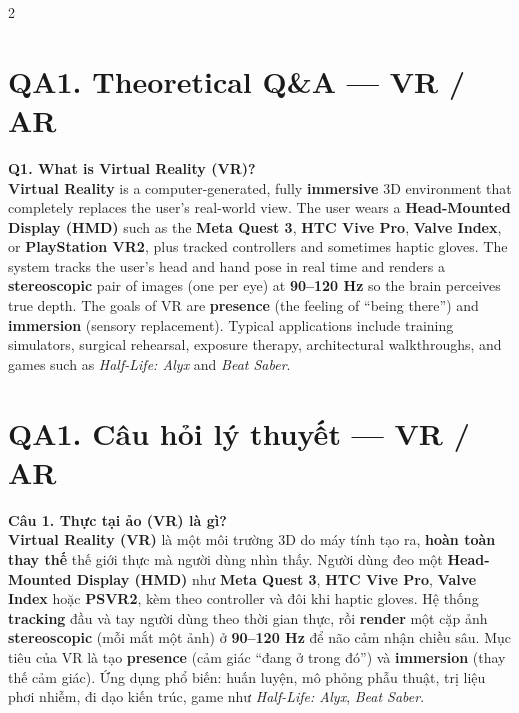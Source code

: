 
\begin{paracol}{2}

\section*{QA1. Theoretical Q\&A --- VR / AR}

\textbf{Q1. What is Virtual Reality (VR)?}\\
\textbf{Virtual Reality} is a computer-generated, fully \textbf{immersive} 3D environment that completely replaces the user's real-world view. The user wears a \textbf{Head-Mounted Display (HMD)} such as the \textbf{Meta Quest 3}, \textbf{HTC Vive Pro}, \textbf{Valve Index}, or \textbf{PlayStation VR2}, plus tracked controllers and sometimes haptic gloves. The system tracks the user's head and hand pose in real time and renders a \textbf{stereoscopic} pair of images (one per eye) at \textbf{90--120 Hz} so the brain perceives true depth. The goals of VR are \textbf{presence} (the feeling of ``being there'') and \textbf{immersion} (sensory replacement). Typical applications include training simulators, surgical rehearsal, exposure therapy, architectural walkthroughs, and games such as \textit{Half-Life: Alyx} and \textit{Beat Saber}.

\switchcolumn

\section*{QA1. Câu hỏi lý thuyết --- VR / AR}

\textbf{Câu 1. Thực tại ảo (VR) là gì?}\\
\textbf{Virtual Reality (VR)} là một môi trường 3D do máy tính tạo ra, \textbf{hoàn toàn thay thế} thế giới thực mà người dùng nhìn thấy. Người dùng đeo một \textbf{Head-Mounted Display (HMD)} như \textbf{Meta Quest 3}, \textbf{HTC Vive Pro}, \textbf{Valve Index} hoặc \textbf{PSVR2}, kèm theo controller và đôi khi haptic gloves. Hệ thống \textbf{tracking} đầu và tay người dùng theo thời gian thực, rồi \textbf{render} một cặp ảnh \textbf{stereoscopic} (mỗi mắt một ảnh) ở \textbf{90--120 Hz} để não cảm nhận chiều sâu. Mục tiêu của VR là tạo \textbf{presence} (cảm giác ``đang ở trong đó'') và \textbf{immersion} (thay thế cảm giác). Ứng dụng phổ biến: huấn luyện, mô phỏng phẫu thuật, trị liệu phơi nhiễm, đi dạo kiến trúc, game như \textit{Half-Life: Alyx}, \textit{Beat Saber}.


\end{paracol}
